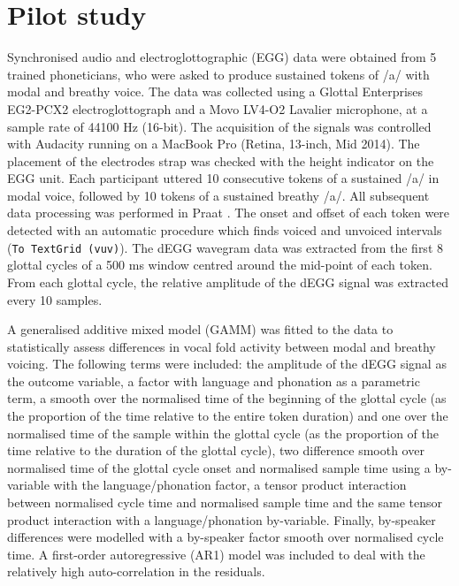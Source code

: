 \documentclass[12pt,a4paper,]{article}
\begin{document}
\hypertarget{pilot-study}{%
\section{Pilot study}\label{pilot-study}}

\label{s:pilot}

Synchronised audio and electroglottographic (EGG) data were obtained
from 5 trained phoneticians, who were asked to produce sustained tokens
of /a/ with modal and breathy voice. The data was collected using a
Glottal Enterprises EG2-PCX2 electroglottograph and a Movo LV4-O2
Lavalier microphone, at a sample rate of 44100 Hz (16-bit). The
acquisition of the signals was controlled with Audacity running on a
MacBook Pro (Retina, 13-inch, Mid 2014). The placement of the electrodes
strap was checked with the height indicator on the EGG unit. Each
participant uttered 10 consecutive tokens of a sustained /a/ in modal
voice, followed by 10 tokens of a sustained breathy /a/. All subsequent
data processing was performed in Praat \citep{boersma2018}. The onset
and offset of each token were detected with an automatic procedure which
finds voiced and unvoiced intervals (\texttt{To\ TextGrid\ (vuv)}). The
dEGG wavegram data was extracted from the first 8 glottal cycles of a
500 ms window centred around the mid-point of each token. From each
glottal cycle, the relative amplitude of the dEGG signal was extracted
every 10 samples.

A generalised additive mixed model (GAMM) was fitted to the data to
statistically assess differences in vocal fold activity between modal
and breathy voicing. The following terms were included: the amplitude of
the dEGG signal as the outcome variable, a factor with language and
phonation as a parametric term, a smooth over the normalised time of the
beginning of the glottal cycle (as the proportion of the time relative
to the entire token duration) and one over the normalised time of the
sample within the glottal cycle (as the proportion of the time relative
to the duration of the glottal cycle), two difference smooth over
normalised time of the glottal cycle onset and normalised sample time
using a by-variable with the language/phonation factor, a tensor product
interaction between normalised cycle time and normalised sample time and
the same tensor product interaction with a language/phonation
by-variable. Finally, by-speaker differences were modelled with a
by-speaker factor smooth over normalised cycle time. A first-order
autoregressive (AR1) model was included to deal with the relatively high
auto-correlation in the residuals.
\end{document}
